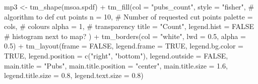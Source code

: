 \documentclass[
  letterpaper,
]{scrbook}
\newenvironment{Shaded}{\begin{snugshade}}{\end{snugshade}}
\newcommand{\AttributeTok}[1]{\textcolor[rgb]{0.40,0.45,0.13}{#1}}
\newcommand{\CommentTok}[1]{\textcolor[rgb]{0.37,0.37,0.37}{#1}}
\newcommand{\ConstantTok}[1]{\textcolor[rgb]{0.56,0.35,0.01}{#1}}
\newcommand{\DecValTok}[1]{\textcolor[rgb]{0.68,0.00,0.00}{#1}}
\newcommand{\FloatTok}[1]{\textcolor[rgb]{0.68,0.00,0.00}{#1}}
\newcommand{\FunctionTok}[1]{\textcolor[rgb]{0.28,0.35,0.67}{#1}}
\newcommand{\NormalTok}[1]{\textcolor[rgb]{0.00,0.23,0.31}{#1}}
\newcommand{\OtherTok}[1]{\textcolor[rgb]{0.00,0.23,0.31}{#1}}
\newcommand{\SpecialCharTok}[1]{\textcolor[rgb]{0.37,0.37,0.37}{#1}}
\newcommand{\StringTok}[1]{\textcolor[rgb]{0.13,0.47,0.30}{#1}}
\begin{document}
\begin{Shaded}
\begin{Highlighting}[]
\NormalTok{mp3 }\OtherTok{\textless{}{-}}  \FunctionTok{tm\_shape}\NormalTok{(msoa.spdf) }\SpecialCharTok{+} 
  \FunctionTok{tm\_fill}\NormalTok{(}\AttributeTok{col =} \StringTok{"pubs\_count"}\NormalTok{, }
          \AttributeTok{style =} \StringTok{"fisher"}\NormalTok{, }\CommentTok{\# algorithm to def cut points}
          \AttributeTok{n =} \DecValTok{10}\NormalTok{, }\CommentTok{\# Number of requested cut points}
          \AttributeTok{palette =}\NormalTok{ cols, }\CommentTok{\# colours}
          \AttributeTok{alpha =} \DecValTok{1}\NormalTok{, }\CommentTok{\# transparency }
          \AttributeTok{title =} \StringTok{"Count"}\NormalTok{, }
          \AttributeTok{legend.hist =} \ConstantTok{FALSE} \CommentTok{\# histogram next to map?}
\NormalTok{          ) }\SpecialCharTok{+}
  \FunctionTok{tm\_borders}\NormalTok{(}\AttributeTok{col =} \StringTok{"white"}\NormalTok{, }\AttributeTok{lwd =} \FloatTok{0.5}\NormalTok{, }\AttributeTok{alpha =} \FloatTok{0.5}\NormalTok{) }\SpecialCharTok{+}
  \FunctionTok{tm\_layout}\NormalTok{(}\AttributeTok{frame =} \ConstantTok{FALSE}\NormalTok{,}
            \AttributeTok{legend.frame =} \ConstantTok{TRUE}\NormalTok{, }\AttributeTok{legend.bg.color =} \ConstantTok{TRUE}\NormalTok{,}
            \AttributeTok{legend.position =} \FunctionTok{c}\NormalTok{(}\StringTok{"right"}\NormalTok{, }\StringTok{"bottom"}\NormalTok{),}
            \AttributeTok{legend.outside =} \ConstantTok{FALSE}\NormalTok{,}
            \AttributeTok{main.title =} \StringTok{"Pubs"}\NormalTok{, }
            \AttributeTok{main.title.position =} \StringTok{"center"}\NormalTok{,}
            \AttributeTok{main.title.size =} \FloatTok{1.6}\NormalTok{,}
            \AttributeTok{legend.title.size =} \FloatTok{0.8}\NormalTok{,}
            \AttributeTok{legend.text.size =} \FloatTok{0.8}\NormalTok{)}



\end{Highlighting}
\end{Shaded}
\end{document}
